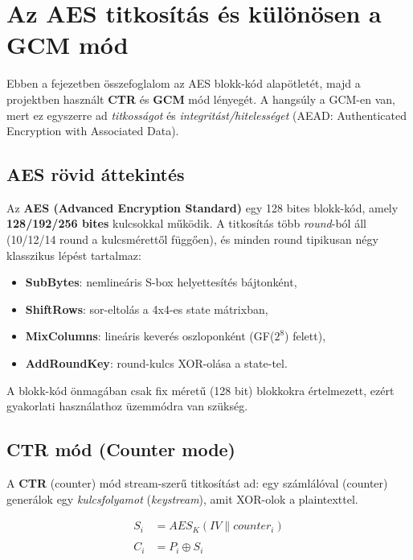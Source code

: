 \chapter{Az AES titkosítás és különösen a GCM mód}

Ebben a fejezetben összefoglalom az AES blokk-kód alapötletét, majd a projektben használt
\textbf{CTR} és \textbf{GCM} mód lényegét. A hangsúly a GCM-en van, mert ez egyszerre ad
\emph{titkosságot} és \emph{integritást/hitelességet} (AEAD: Authenticated Encryption with Associated Data).

\section{AES rövid áttekintés}

Az \textbf{AES (Advanced Encryption Standard)} egy 128 bites blokk-kód, amely
\textbf{128/192/256 bites} kulcsokkal működik. A titkosítás több \emph{round}-ból áll
(10/12/14 round a kulcsmérettől függően), és minden round tipikusan négy klasszikus lépést tartalmaz:

\begin{itemize}
  \item \textbf{SubBytes}: nemlineáris S-box helyettesítés bájtonként,
  \item \textbf{ShiftRows}: sor-eltolás a 4x4-es state mátrixban,
  \item \textbf{MixColumns}: lineáris keverés oszloponként (GF($2^8$) felett),
  \item \textbf{AddRoundKey}: round-kulcs XOR-olása a state-tel.
\end{itemize}

A blokk-kód önmagában csak fix méretű (128 bit) blokkokra értelmezett, ezért gyakorlati használathoz
üzemmódra van szükség.

\section{CTR mód (Counter mode)}

A \textbf{CTR} (counter) mód stream-szerű titkosítást ad: egy számlálóval (counter) generálok
egy \emph{kulcsfolyamot} (\emph{keystream}), amit XOR-olok a plaintexttel.

\begin{align*}
  S_i &= AES_K(IV \| counter_i) \\\\
  C_i &= P_i \oplus S_i
\end{align*}

